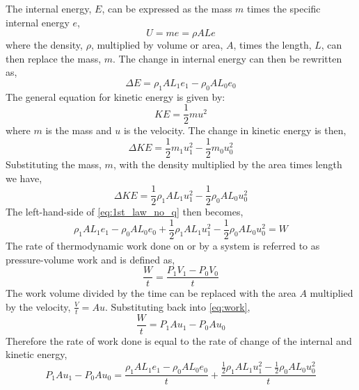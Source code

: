 The internal energy, $E$, can be expressed as the mass $m$ times the specific internal energy $e$,
\begin{equation} \label{eq:spec_int_energy}
U = me = \rho ALe
\end{equation}
where the density, $\rho$, multiplied by volume or area, $A$, times the length, $L$, can then replace the mass, $m$.
The change in internal energy can then be rewritten as,
\begin{equation} \label{eq:change_energy}
\Delta E = \rho_1 AL_1e_1 - \rho_0 AL_0e_0
\end{equation}
The general equation for kinetic energy is given by:
\begin{equation} \label{eq:ke}
KE = \frac{1}{2}mu^2
\end{equation}
where $m$ is the mass and $u$ is the velocity.  The change in kinetic energy is then,
\begin{equation} \label{eq:change_in_ke}
\Delta KE = \frac{1}{2}m_1u_1^2 - \frac{1}{2}m_0u_0^2
\end{equation}
Substituting the mass, $m$, with the density multiplied by the area times length we have,
\begin{equation} \label{eq:change_in_ke_no_mass}
\Delta KE = \frac{1}{2}\rho_1 AL_1u_1^2 - \frac{1}{2}\rho_0 AL_0u_0^2
\end{equation}
The left-hand-side of \ref{eq:1st_law_no_q} then becomes,
\begin{equation} \label{eq:lhs_energy}
\rho_1 AL_1e_1 - \rho_0 AL_0e_0 + \frac{1}{2}\rho_1 AL_1u_1^2 - \frac{1}{2}\rho_0 AL_0u_0^2 = W
\end{equation}
The rate of thermodynamic work done on or by a system is referred to as pressure-volume work and is defined as,
\begin{equation} \label{eq:work}
\frac{W}{t} = \frac{P_1V_1 - P_0V_0}{t}
\end{equation}
The work volume divided by the time can be replaced with the area $A$ multiplied by the velocity, $\frac{V}{t} = Au$.  Substituting back into \ref{eq:work},
\begin{equation} \label{eq:work2}
\frac{W}{t} = P_1Au_1 - P_0Au_0
\end{equation}
Therefore the rate of work done is equal to the rate of change of the internal and kinetic energy,
\begin{equation} \label{eq:both_sides_energy}
P_1Au_1 - P_0Au_0 = \frac{\rho_1 AL_1e_1 - \rho_0 AL_0e_0}{t} + \frac{\frac{1}{2}\rho_1 AL_1u_1^2 - \frac{1}{2}\rho_0 AL_0u_0^2}{t}
\end{equation}
